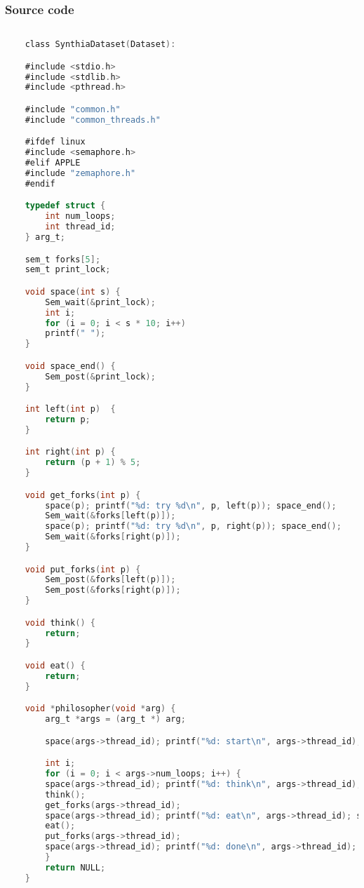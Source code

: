 \documentclass[11pt,a4paper]{article}
\begin{document}
\subsubsection{\textbf{Source code}}
\begin{lstlisting}[language=C, caption= Source code,label={labelkode}]
    
    class SynthiaDataset(Dataset):

    #include <stdio.h>
    #include <stdlib.h>
    #include <pthread.h>

    #include "common.h"
    #include "common_threads.h"

    #ifdef linux
    #include <semaphore.h>
    #elif APPLE
    #include "zemaphore.h"
    #endif

    typedef struct {
        int num_loops;
        int thread_id;
    } arg_t;

    sem_t forks[5];
    sem_t print_lock;

    void space(int s) {
        Sem_wait(&print_lock);
        int i;
        for (i = 0; i < s * 10; i++)
	    printf(" ");
    }

    void space_end() {
        Sem_post(&print_lock);
    }

    int left(int p)  {
        return p;
    }

    int right(int p) {
        return (p + 1) % 5;
    }

    void get_forks(int p) {
        space(p); printf("%d: try %d\n", p, left(p)); space_end();
        Sem_wait(&forks[left(p)]);
        space(p); printf("%d: try %d\n", p, right(p)); space_end();
        Sem_wait(&forks[right(p)]);
    }

    void put_forks(int p) {
        Sem_post(&forks[left(p)]);
        Sem_post(&forks[right(p)]);
    }

    void think() {
        return;
    }

    void eat() {
        return;
    }

    void *philosopher(void *arg) {
        arg_t *args = (arg_t *) arg;

        space(args->thread_id); printf("%d: start\n", args->thread_id); space_end();

        int i;
        for (i = 0; i < args->num_loops; i++) {
	    space(args->thread_id); printf("%d: think\n", args->thread_id); space_end();
	    think();
	    get_forks(args->thread_id);
	    space(args->thread_id); printf("%d: eat\n", args->thread_id); space_end();
	    eat();
	    put_forks(args->thread_id);
	    space(args->thread_id); printf("%d: done\n", args->thread_id); space_end();
        }
        return NULL;
    }
                                                                             

\end{lstlisting}
\end{document}
